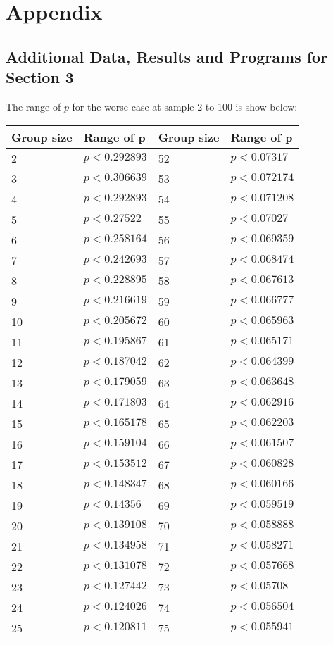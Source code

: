 \section{Appendix}
\subsection{Additional Data, Results and Programs for Section 3}
The range of $p$ for the worse case at sample 2 to 100 is show below:
\begin{longtable}{p{3cm}p{5cm}p{3cm}p{5cm}}
\toprule
\textbf{Group size}&\textbf{Range of p}&\textbf{Group size}&\textbf{Range of p}\\
\toprule
2&$p<0.292893$&52&$p<0.07317$\\\midrule
3&$p<0.306639$&53&$p<0.072174$\\\midrule
4&$p<0.292893$&54&$p<0.071208$\\\midrule
5&$p<0.27522$&55&$p<0.07027$\\\midrule
6&$p<0.258164$&56&$p<0.069359$\\\midrule
7&$p<0.242693$&57&$p<0.068474$\\\midrule
8&$p<0.228895$&58&$p<0.067613$\\\midrule
9&$p<0.216619$&59&$p<0.066777$\\\midrule
10&$p<0.205672$&60&$p<0.065963$\\\midrule
11&$p<0.195867$&61&$p<0.065171$\\\midrule
12&$p<0.187042$&62&$p<0.064399$\\\midrule
13&$p<0.179059$&63&$p<0.063648$\\\midrule
14&$p<0.171803$&64&$p<0.062916$\\\midrule
15&$p<0.165178$&65&$p<0.062203$\\\midrule
16&$p<0.159104$&66&$p<0.061507$\\\midrule
17&$p<0.153512$&67&$p<0.060828$\\\midrule
18&$p<0.148347$&68&$p<0.060166$\\\midrule
19&$p<0.14356$&69&$p<0.059519$\\\midrule
20&$p<0.139108$&70&$p<0.058888$\\\midrule
21&$p<0.134958$&71&$p<0.058271$\\\midrule
22&$p<0.131078$&72&$p<0.057668$\\\midrule
23&$p<0.127442$&73&$p<0.05708$\\\midrule
24&$p<0.124026$&74&$p<0.056504$\\\midrule
25&$p<0.120811$&75&$p<0.055941$\\\midrule

\end{longtable}
